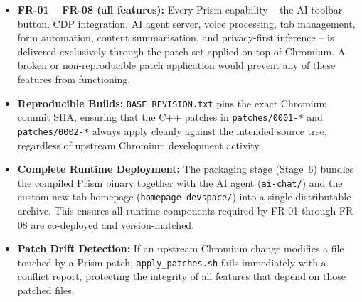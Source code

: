 \begin{itemize}[leftmargin=*]
    \item \textbf{FR-01 -- FR-08 (all features):} Every Prism capability -- the AI toolbar button, CDP integration, AI agent server, voice processing, tab management, form automation, content summarisation, and privacy-first inference -- is delivered exclusively through the patch set applied on top of Chromium. A broken or non-reproducible patch application would prevent any of these features from functioning.
    \item \textbf{Reproducible Builds:} \texttt{BASE\_REVISION.txt} pins the exact Chromium commit SHA, ensuring that the C++ patches in \texttt{patches/0001-*} and \texttt{patches/0002-*} always apply cleanly against the intended source tree, regardless of upstream Chromium development activity.
    \item \textbf{Complete Runtime Deployment:} The packaging stage (Stage~6) bundles the compiled Prism binary together with the AI agent (\texttt{ai-chat/}) and the custom new-tab homepage (\texttt{homepage-devspace/}) into a single distributable archive. This ensures all runtime components required by FR-01 through FR-08 are co-deployed and version-matched.
    \item \textbf{Patch Drift Detection:} If an upstream Chromium change modifies a file touched by a Prism patch, \texttt{apply\_patches.sh} fails immediately with a conflict report, protecting the integrity of all features that depend on those patched files.
\end{itemize}
